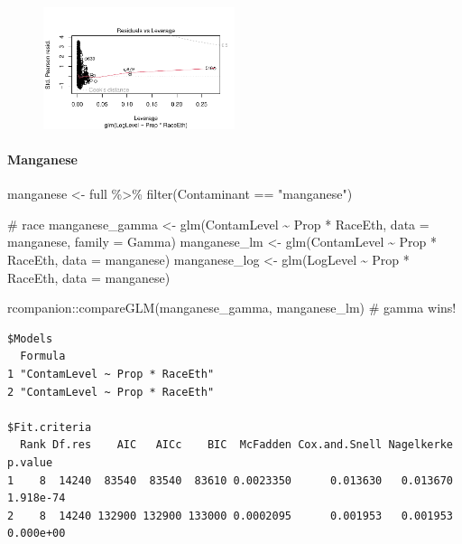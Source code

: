 \documentclass[
  letterpaper,
  DIV=11,
  numbers=noendperiod]{scrartcl}
\let\oldparagraph\paragraph
\renewcommand{\paragraph}[1]{\oldparagraph{#1}\mbox{}}
\newenvironment{Shaded}{\begin{snugshade}}{\end{snugshade}}
\newcommand{\AttributeTok}[1]{\textcolor[rgb]{0.40,0.45,0.13}{#1}}
\newcommand{\CommentTok}[1]{\textcolor[rgb]{0.37,0.37,0.37}{#1}}
\newcommand{\FunctionTok}[1]{\textcolor[rgb]{0.28,0.35,0.67}{#1}}
\newcommand{\NormalTok}[1]{\textcolor[rgb]{0.00,0.23,0.31}{#1}}
\newcommand{\OtherTok}[1]{\textcolor[rgb]{0.00,0.23,0.31}{#1}}
\newcommand{\SpecialCharTok}[1]{\textcolor[rgb]{0.37,0.37,0.37}{#1}}
\newcommand{\StringTok}[1]{\textcolor[rgb]{0.13,0.47,0.30}{#1}}
\begin{document}
\begin{figure}[H]

{\centering \includegraphics[width=0.5\textwidth,height=\textheight]{appendix_files/figure-pdf/unnamed-chunk-3-4.pdf}

}

\end{figure}

\hypertarget{manganese}{%
\paragraph{Manganese}\label{manganese}}

\begin{Shaded}
\begin{Highlighting}[]
\NormalTok{manganese }\OtherTok{\textless{}{-}}\NormalTok{ full }\SpecialCharTok{\%\textgreater{}\%}
  \FunctionTok{filter}\NormalTok{(Contaminant }\SpecialCharTok{==} \StringTok{"manganese"}\NormalTok{)}

\CommentTok{\# race}
\NormalTok{manganese\_gamma }\OtherTok{\textless{}{-}} \FunctionTok{glm}\NormalTok{(ContamLevel }\SpecialCharTok{\textasciitilde{}}\NormalTok{ Prop }\SpecialCharTok{*}\NormalTok{ RaceEth, }\AttributeTok{data =}\NormalTok{ manganese, }\AttributeTok{family =}\NormalTok{ Gamma)}
\NormalTok{manganese\_lm }\OtherTok{\textless{}{-}} \FunctionTok{glm}\NormalTok{(ContamLevel }\SpecialCharTok{\textasciitilde{}}\NormalTok{ Prop }\SpecialCharTok{*}\NormalTok{ RaceEth, }\AttributeTok{data =}\NormalTok{ manganese)}
\NormalTok{manganese\_log }\OtherTok{\textless{}{-}} \FunctionTok{glm}\NormalTok{(LogLevel }\SpecialCharTok{\textasciitilde{}}\NormalTok{ Prop }\SpecialCharTok{*}\NormalTok{ RaceEth, }\AttributeTok{data =}\NormalTok{ manganese)}

\NormalTok{rcompanion}\SpecialCharTok{::}\FunctionTok{compareGLM}\NormalTok{(manganese\_gamma, manganese\_lm) }\CommentTok{\# gamma wins!}
\end{Highlighting}
\end{Shaded}

\begin{verbatim}
$Models
  Formula                       
1 "ContamLevel ~ Prop * RaceEth"
2 "ContamLevel ~ Prop * RaceEth"

$Fit.criteria
  Rank Df.res    AIC   AICc    BIC  McFadden Cox.and.Snell Nagelkerke   p.value
1    8  14240  83540  83540  83610 0.0023350      0.013630   0.013670 1.918e-74
2    8  14240 132900 132900 133000 0.0002095      0.001953   0.001953 0.000e+00
\end{verbatim}
\end{document}
